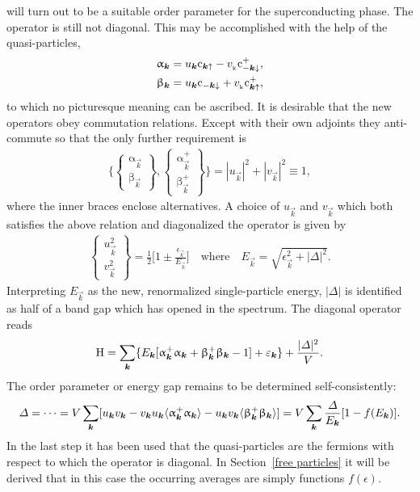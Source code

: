 %
will turn out to be a suitable order parameter for the superconducting phase.
The  operator is still not diagonal. This may be accomplished
with the help of the  quasi-particles,
%
\begin{align*}
    \upalpha_{\boldsymbol k} &=
        u_{\boldsymbol k} \mathrm c_{\boldsymbol k \uparrow} - v_{\sb{\text{k}}} \mathrm c_{-\boldsymbol k \downarrow}^+, \\
    \upbeta_{\boldsymbol k} &=
        u_{\boldsymbol k} \mathrm c_{-\boldsymbol k \downarrow} + v_{\sb{\text{k}}} \mathrm c_{\boldsymbol k \uparrow}^+,
\end{align*}
%
to which no picturesque meaning can be ascribed. It is desirable that the new
operators obey  commutation relations. Except with their own
adjoints they anti-commute so that the only further requirement is
%
\begin{gather*}
    \Bigg \{
        \begin{Bmatrix} \upalpha_{\vec k}   \\ \upbeta_{\vec k}   \end{Bmatrix},
        \begin{Bmatrix} \upalpha_{\vec k}^+ \\ \upbeta_{\vec k}^+ \end{Bmatrix}
    \Bigg \}
    = |u_{\vec k}|^2 + |v_{\vec k}|^2 \equiv 1,
\end{gather*}
%
where the inner braces enclose alternatives. A choice of $u_{\vec k}$ and
$v_{\vec k}$ which both satisfies the above relation and diagonalized the
 operator is given by
%
\begin{gather*}
    \begin{Bmatrix} u_{\vec k}^2 \\ v_{\vec k}^2 \end{Bmatrix} = \frac 1 2
    \Big[ 1 \pm \frac{\epsilon_{\vec k}}{E_{\vec k}} \Big]
    \quad \text{where} \quad
    E_{\vec k} = \sqrt{\epsilon_{\vec k}^2 + |\Delta|^2}.
\end{gather*}
%
Interpreting $E_{\vec k}$ as the new, renormalized single-particle energy,
$|\Delta|$ is identified as half of a band gap which has opened in the spectrum.
The diagonal  operator reads
%
\begin{gather*}
    \mathrm H =
    \sum_{\boldsymbol k} \{ E_{\boldsymbol k} [
        \upalpha_{\boldsymbol k}^+ \upalpha_{\boldsymbol k}
        + \upbeta_{\boldsymbol k}^+ \upbeta_{\boldsymbol k} - 1
        ]
    + \varepsilon_{\boldsymbol k} \} + \frac {|\varDelta|^2} V.
\end{gather*}
%
The order parameter or energy gap remains to be determined self-consistently:
%
\begin{gather*}
    \varDelta = \dots
    = V \sum_{\boldsymbol k} [
        u_{\boldsymbol k} v_{\boldsymbol k} - v_{\boldsymbol k} u_{\boldsymbol k}
        \langle\upalpha_{\boldsymbol k}^+ \upalpha_{\boldsymbol k}\rangle - u_{\boldsymbol k} v_{\boldsymbol k}
        \langle\upbeta_{\boldsymbol k}^+ \upbeta_{\boldsymbol k}\rangle
        ]
    = V \sum_{\boldsymbol k} \frac {\varDelta} {E_{\boldsymbol k}} [1 - f(E_{\boldsymbol k})].
\end{gather*}
%
In the last step it has been used that the  quasi-particles are
the fermions with respect to which the  operator is diagonal. In
Section~\ref{free particles} it will be derived that in this case the occurring
averages are simply  functions $f(\epsilon)$.

